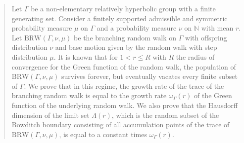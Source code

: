 \documentclass{amsart}
\newcommand{\showcomments}{yes}
\newenvironment{comment}%
{\ifthenelse{\equal{\showcomments}{yes}}%
{\footnotemark
    \begin{lrbox}{\commentbox}
    \begin{minipage}[t]{1.25in}\raggedright\sffamily\upshape\tiny
    \footnotemark[\arabic{footnote}]}%
{\begin{lrbox}{\commentbox}}}%
{\ifthenelse{\equal{\showcomments}{yes}}%
{\end{minipage}\end{lrbox}\marginpar{\usebox{\commentbox}}}%
{\end{lrbox}}}
\theoremstyle{definition}
\theoremstyle{remark}
\newcommand{\e}[1]{\omega(#1)}
\begin{document}
\begin{abstract}
 Let $\Gamma$ be a non-elementary relatively hyperbolic group with a finite generating set.  Consider a finitely supported admissible and symmetric probability measure $\mu$ on $\Gamma$ and a probability measure $\nu$ on $\mathbb{N}$ with mean $r$.  Let $\mathrm{BRW}(\Gamma,\nu,\mu)$ be the branching random walk on $\Gamma$ with offspring distribution $\nu$ and base motion given by the random walk with step distribution $\mu$.  It is known that for $1 < r \leq R$ with $R$ the radius of convergence for the Green function of the random walk, the population of $\mathrm{BRW}(\Gamma,\nu,\mu)$ survives forever, but eventually vacates every finite subset of $\Gamma$.  We prove that in this regime, the growth rate of the trace of the branching random walk is equal to the growth rate $\omega_\Gamma(r)$ of the Green function of the underlying random walk. We also prove that the Hausdorff dimension of the limit set $\Lambda(r)$, which is the random subset of the Bowditch boundary consisting of all accumulation points of the trace of $\mathrm{BRW}(\Gamma,\nu,\mu)$, is equal to a constant times $\omega_\Gamma(r)$.
\end{abstract}
\maketitle




\end{document}
